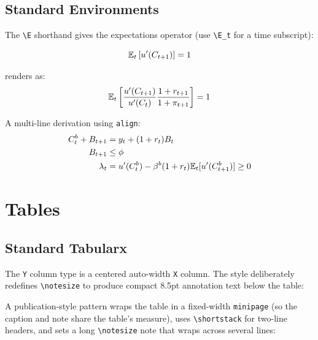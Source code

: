 \documentclass[11pt,a4paper]{article}
\begin{document}
\subsection{Standard Environments}

The \verb|\E| shorthand gives the expectations operator (use \verb|\E_t| for a time subscript):

\begin{democode}
\[ \mathbb{E}_t\left[ u'(C_{t+1}) \right] = 1 \]
\end{democode}

\noindent renders as:
\[
    \mathbb{E}_t\left[\frac{u'(C_{t+1})}{u'(C_t)}\frac{1+r_{t+1}}{1+\pi_{t+1}}\right] = 1
\]

A multi-line derivation using \texttt{align}:
\begin{align}
    C_t^b + B_{t+1} &= y_t + (1+r_t)B_t \\
    B_{t+1}         &\leq \phi \label{eq:constraint}\\
    \lambda_t       &= u'(C_t^b) - \beta^b(1+r_t)\mathbb{E}_t[u'(C_{t+1}^b)] \geq 0
\end{align}

\section{Tables}

\subsection{Standard Tabularx}

The \texttt{Y} column type is a centered auto-width \texttt{X} column. The style deliberately redefines \verb|\notesize| to produce compact 8.5pt annotation text below the table:

A publication-style pattern wraps the table in a fixed-width \texttt{minipage} (so the caption and note share the table's measure), uses \verb|\shortstack| for two-line headers, and sets a long \verb|\notesize| note that wraps across several lines:
\end{document}
